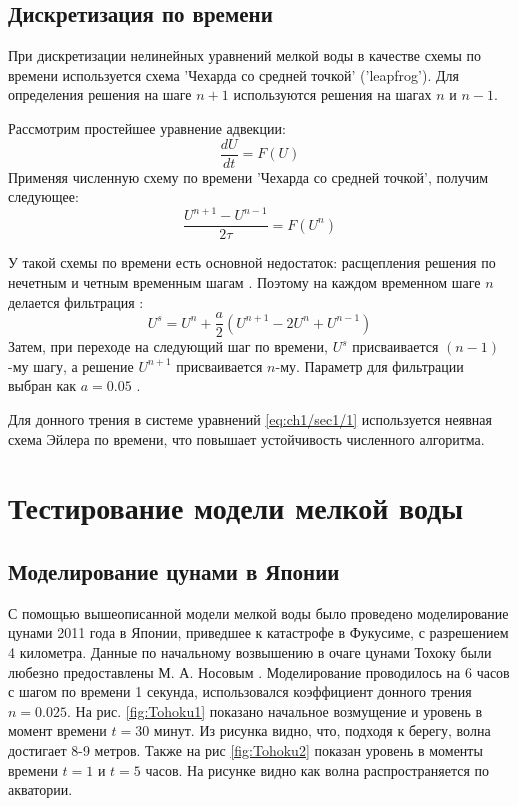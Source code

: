 \subsection{Дискретизация по времени}\label{sec:ch1/sec2-2}

При дискретизации нелинейных уравнений мелкой воды в качестве схемы по времени  используется схема 'Чехарда со средней точкой' ('leapfrog').
Для определения решения на шаге $n+1$ используются решения на шагах $n$ и $n-1$.

Рассмотрим простейшее уравнение адвекции:
\begin{equation} \label{eq:ch1/sec1/6}
    \frac{dU}{dt} = F(U)
\end{equation}
Применяя численную схему по времени 'Чехарда со средней точкой', получим следующее:
\begin{equation} \label{eq:ch1/sec1/7}
    \frac{U^{n+1} -U^{n-1} }{2\tau } = F(U^{n})
\end{equation}

У такой схемы по времени есть основной недостаток: расщепления решения по нечетным и четным временным шагам \cite{ROUCH}.
Поэтому на каждом временном шаге $n$ делается фильтрация \cite{POM}:
\begin{equation} \label{eq:ch1/sec1/8}
    U^{s} = U^{n} + \frac{a}{2}(U^{n+1} - 2U^n + U^{n-1})
\end{equation}
Затем, при переходе на следующий шаг по времени, $U^{s}$ присваивается $(n-1)$-му шагу, а решение $U^{n+1}$ присваивается $n$-му.
Параметр для фильтрации выбран как $a = 0.05$ \cite{POM}.

Для донного трения в системе уравнений \cref{eq:ch1/sec1/1} используется неявная схема Эйлера по времени,
что повышает устойчивость численного алгоритма.

\section{Тестирование модели мелкой воды}

\subsection{Моделирование цунами в Японии}
С помощью вышеописанной модели мелкой воды было проведено моделирование цунами 2011 года в Японии, приведшее к катастрофе в Фукусиме, с разрешением 4 километра. Данные по начальному возвышению в очаге цунами Тохоку были любезно предоставлены М. А. Носовым \cite{NosovTsunami}.
Моделирование проводилось на 6 часов с шагом по времени 1 секунда, использовался коэффициент донного трения $n = 0.025$.
На рис. \ref{fig:Tohoku1} показано начальное возмущение и уровень в момент времени $t=30$ минут. Из рисунка видно, что, подходя к берегу, волна достигает 8-9 метров.
Также на рис \ref{fig:Tohoku2} показан уровень в моменты времени $t=1$ и $t=5$ часов. 
На рисунке видно как волна распространяется по акватории.
	
